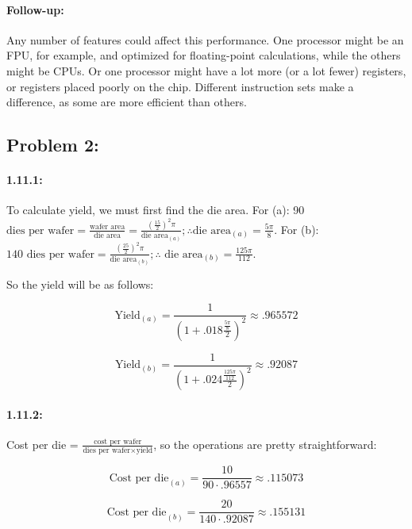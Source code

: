 \documentclass[a4paper]{article}
\begin{document}
\paragraph*{Follow-up:} Any number of features could affect this performance. One processor might be an FPU, for example, and optimized for floating-point calculations, while the others might be CPUs. Or one processor might have a lot more (or a lot fewer) registers, or registers placed poorly on the chip. Different instruction sets make a difference, as some are more efficient than others.

\subsection*{Problem 2:}

\paragraph*{1.11.1:} To calculate yield, we must first find the die area. For (a): 90 $\mbox{dies per wafer} = \frac{\mbox{wafer area}}{\mbox{die area}} = \frac{(\frac{15}{2})^2\pi}{\mbox{die area}_{(a)}}; \therefore \mbox{die area}_{(a)} = \frac{5\pi}{8}$. For (b): $140\mbox{ dies per wafer} = \frac{(\frac{25}{2})^2\pi}{\mbox{die area}_{(b)}}; \therefore \mbox{ die area}_{(b)} = \frac{125\pi}{112}$.

So the yield will be as follows:

\begin{equation}
\mbox{Yield}_{(a)} = \frac{1}{(1+.018 \frac{\frac{5\pi}{8}}{2})^2} \approx{.965572}
\end{equation}

\begin{equation}
\mbox{Yield}_{(b)} = \frac{1}{(1+.024 \frac{\frac{125\pi}{112}}{2})^2} \approx{.92087}
\end{equation}

\paragraph*{1.11.2:} Cost per die = $\frac{\mbox{cost per wafer}}{\mbox{dies per wafer} \times \mbox{yield}}$, so the operations are pretty straightforward:

\begin{equation}
\mbox{Cost per die}_{(a)} = \frac{10}{90 \cdot .96557} \approx{.115073}
\end{equation}

\begin{equation}
\mbox{Cost per die}_{(b)} = \frac{20}{140 \cdot .92087} \approx{.155131}
\end{equation}
\end{document}
